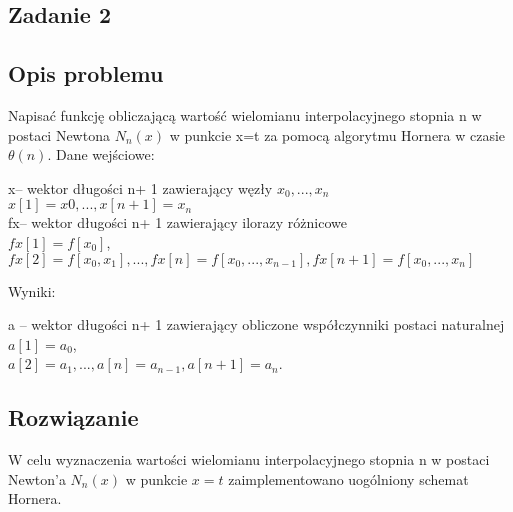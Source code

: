 \documentclass[11pt]{article}
\begin{document}
\begin{flushleft}
\section{Zadanie 2}
\subsection{Opis problemu}
Napisać funkcję obliczającą wartość wielomianu interpolacyjnego stopnia n w postaci Newtona $N_n(x)$ w punkcie x=t za pomocą algorytmu Hornera w czasie $\theta(n)$. Dane wejściowe:\\
\begin{center}
x– wektor długości n+ 1 zawierający węzły $x_0, ...,x_n$\\$x[1]=x0,...,x[n+1]=x_n$\\
fx– wektor długości n+ 1 zawierający ilorazy  różnicowe \\$fx[1]=f[x_0]$,\\
$fx[2]=f[x_0, x_1],...,fx[n]=f[x_0, . . . , x_{n−1}],fx[n+1]=f[x_0, . . . , x_n]$
\end{center}
\begin{flushleft}
Wyniki:
\begin{center}
a – wektor długości n+ 1 zawierający obliczone współczynniki postaci naturalnej\\
$a[1]=a_0$,\\
$a[2]=a_1,...,a[n]
=a_{n−1},a[n+1]=a_n$.\\
\end{center}
\end{flushleft}
\subsection{Rozwiązanie}
W celu wyznaczenia wartości wielomianu interpolacyjnego stopnia n w postaci Newton'a $N_n(x)$ w punkcie $x=t$ zaimplementowano uogólniony schemat Hornera.\\

\end{flushleft}
\end{document}
